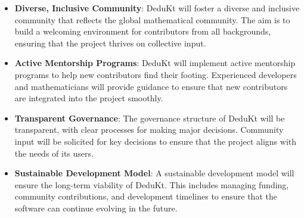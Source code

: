 \begin{itemize}
    \item \textbf{Diverse, Inclusive Community}: DeduKt will foster a diverse and inclusive community that reflects the global mathematical community.
    The aim is to build a welcoming environment for contributors from all backgrounds, ensuring that the project thrives on collective input.

    \item \textbf{Active Mentorship Programs}: DeduKt will implement active mentorship programs to help new contributors find their footing.
    Experienced developers and mathematicians will provide guidance to ensure that new contributors are integrated into the project smoothly.

    \item \textbf{Transparent Governance}: The governance structure of DeduKt will be transparent, with clear processes for making major decisions.
    Community input will be solicited for key decisions to ensure that the project aligns with the needs of its users.

    \item \textbf{Sustainable Development Model}: A sustainable development model will ensure the long-term viability of DeduKt.
    This includes managing funding, community contributions, and development timelines to ensure that the software can continue evolving in the future.
\end{itemize}
